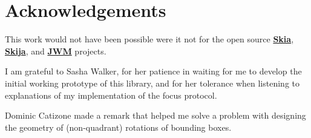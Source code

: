 \documentclass[12pt,a4paper]{article}
\begin{document}
\section*{Acknowledgements}
This work would not have been possible were it not for the
open source \href{https://skia.org/}{\textbf{Skia}},
\href{https://github.com/HumbleUI/HumbleUI}{\textbf{Skija}},
and \href{https://github.com/HumbleUI/JWM}{\textbf{JWM}} projects.

I am grateful to Sasha Walker,
for her patience in waiting for me to develop the initial working prototype of this
library, and for her tolerance when listening to explanations of my implementation
of the focus protocol. 

Dominic Catizone\Footnotemark{$*$} made a remark that helped me solve a
problem with designing the geometry of (non-quadrant) rotations of bounding boxes.
\end{document}
